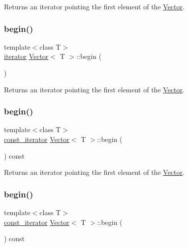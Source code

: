 Returns an iterator pointing the first element of the \hyperlink{classVector}{Vector}. \mbox{\label{classVector_a466e8c045ea10d62c28b689888e9fe5a}} 
\subsubsection{\texorpdfstring{begin()}{begin()}\hspace{0.1cm}{\footnotesize\ttfamily [2/4]}}
{\footnotesize\ttfamily template$<$class T$>$ \\
\hyperlink{classVector_a45531016f99e90887e0f890f2da943e4}{iterator} \hyperlink{classVector}{Vector}$<$ T $>$\+::begin (\begin{DoxyParamCaption}{ }\end{DoxyParamCaption})\hspace{0.3cm}{\ttfamily [inline]}}

Returns an iterator pointing the first element of the \hyperlink{classVector}{Vector}. \mbox{\label{classVector_a514c5f6246f07f0012f1d00912838b19}} 
\subsubsection{\texorpdfstring{begin()}{begin()}\hspace{0.1cm}{\footnotesize\ttfamily [3/4]}}
{\footnotesize\ttfamily template$<$class T$>$ \\
\hyperlink{classVector_a484e934cc06bb84c7d70042e792b6e55}{const\+\_\+iterator} \hyperlink{classVector}{Vector}$<$ T $>$\+::begin (\begin{DoxyParamCaption}{ }\end{DoxyParamCaption}) const\hspace{0.3cm}{\ttfamily [inline]}}

Returns an iterator pointing the first element of the \hyperlink{classVector}{Vector}. \mbox{\label{classVector_a514c5f6246f07f0012f1d00912838b19}} 
\subsubsection{\texorpdfstring{begin()}{begin()}\hspace{0.1cm}{\footnotesize\ttfamily [4/4]}}
{\footnotesize\ttfamily template$<$class T$>$ \\
\hyperlink{classVector_a484e934cc06bb84c7d70042e792b6e55}{const\+\_\+iterator} \hyperlink{classVector}{Vector}$<$ T $>$\+::begin (\begin{DoxyParamCaption}{ }\end{DoxyParamCaption}) const\hspace{0.3cm}{\ttfamily [inline]}}


